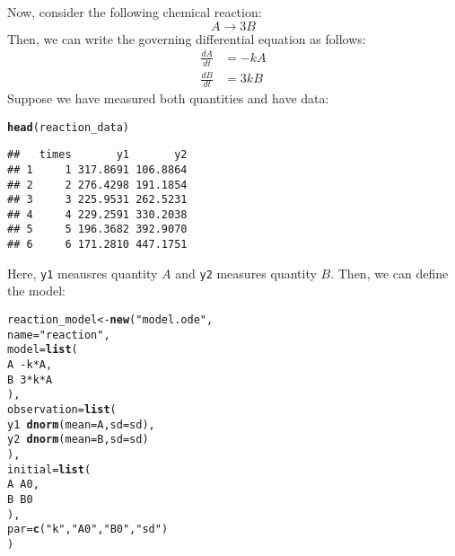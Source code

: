 \documentclass{article}\usepackage[]{graphicx}\usepackage[]{color}
\makeatletter
\newcommand{\hlnum}[1]{\textcolor[rgb]{0.686,0.059,0.569}{#1}}%
\newcommand{\hlstr}[1]{\textcolor[rgb]{0.192,0.494,0.8}{#1}}%
\newcommand{\hlopt}[1]{\textcolor[rgb]{0,0,0}{#1}}%
\newcommand{\hlstd}[1]{\textcolor[rgb]{0.345,0.345,0.345}{#1}}%
\newcommand{\hlkwb}[1]{\textcolor[rgb]{0.69,0.353,0.396}{#1}}%
\newcommand{\hlkwc}[1]{\textcolor[rgb]{0.333,0.667,0.333}{#1}}%
\newcommand{\hlkwd}[1]{\textcolor[rgb]{0.737,0.353,0.396}{\textbf{#1}}}%
\newenvironment{kframe}{%
 \def\at@end@of@kframe{}%
 \ifinner\ifhmode%
  \def\at@end@of@kframe{\end{minipage}}%
  \begin{minipage}{\columnwidth}%
 \fi\fi%
 \def\FrameCommand##1{\hskip\@totalleftmargin \hskip-\fboxsep
 \colorbox{shadecolor}{##1}\hskip-\fboxsep
     \hskip-\linewidth \hskip-\@totalleftmargin \hskip\columnwidth}%
 \MakeFramed {\advance\hsize-\width
   \@totalleftmargin\z@ \linewidth\hsize
   \@setminipage}}%
 {\par\unskip\endMakeFramed%
 \at@end@of@kframe}
\newenvironment{knitrout}{}{} %
\newcommand{\code}[1]{{\tt #1}}
\makeatother
\begin{document}
Now, consider the following chemical reaction:
$$
A \to 3 B
$$
Then, we can write the governing differential equation as follows:
$$
\begin{aligned}
\frac{dA}{dt} &= - k A\\
\frac{dB}{dt} &= 3 k B
\end{aligned}
$$
Suppose we have measured both quantities and have data:


\begin{knitrout}
\color{fgcolor}\begin{kframe}
\begin{alltt}
\hlkwd{head}\hlstd{(reaction_data)}
\end{alltt}
\begin{verbatim}
##   times       y1       y2
## 1     1 317.8691 106.8864
## 2     2 276.4298 191.1854
## 3     3 225.9531 262.5231
## 4     4 229.2591 330.2038
## 5     5 196.3682 392.9070
## 6     6 171.2810 447.1751
\end{verbatim}
\end{kframe}
\end{knitrout}

Here, \code{y1} meausres quantity $A$ and \code{y2} measures quantity $B$.
Then, we can define the model:

\begin{knitrout}
\color{fgcolor}\begin{kframe}
\begin{alltt}
\hlstd{reaction_model} \hlkwb{<-} \hlkwd{new}\hlstd{(}\hlstr{"model.ode"}\hlstd{,}
    \hlkwc{name} \hlstd{=} \hlstr{"reaction"}\hlstd{,}
    \hlkwc{model} \hlstd{=} \hlkwd{list}\hlstd{(}
        \hlstd{A} \hlopt{~ -} \hlstd{k} \hlopt{*} \hlstd{A,}
        \hlstd{B} \hlopt{~} \hlnum{3} \hlopt{*} \hlstd{k} \hlopt{*} \hlstd{A}
    \hlstd{),}
    \hlkwc{observation} \hlstd{=} \hlkwd{list}\hlstd{(}
        \hlstd{y1} \hlopt{~} \hlkwd{dnorm}\hlstd{(}\hlkwc{mean}\hlstd{=A,} \hlkwc{sd}\hlstd{=sd),}
        \hlstd{y2} \hlopt{~} \hlkwd{dnorm}\hlstd{(}\hlkwc{mean}\hlstd{=B,} \hlkwc{sd}\hlstd{=sd)}
    \hlstd{),}
    \hlkwc{initial} \hlstd{=} \hlkwd{list}\hlstd{(}
        \hlstd{A}\hlopt{~}\hlstd{A0,}
        \hlstd{B}\hlopt{~}\hlstd{B0}
    \hlstd{),}
    \hlkwc{par}\hlstd{=}\hlkwd{c}\hlstd{(}\hlstr{"k"}\hlstd{,} \hlstr{"A0"}\hlstd{,} \hlstr{"B0"}\hlstd{,} \hlstr{"sd"}\hlstd{)}
\hlstd{)}
\end{alltt}
\end{kframe}
\end{knitrout}
\end{document}
